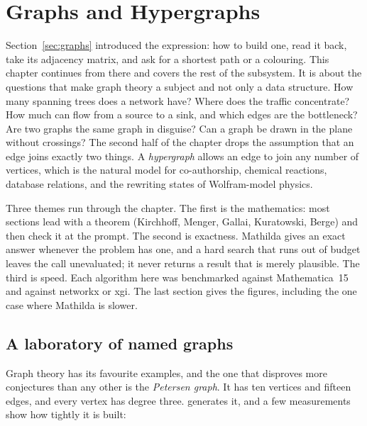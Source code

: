 \chapter{Graphs and Hypergraphs}
\label{ch:graphs}


Section~\ref{sec:graphs} introduced the  expression: how to build one,
read it back, take its adjacency matrix, and ask for a shortest path or a
colouring. This chapter continues from there and covers the rest of the
subsystem. It is about the questions that make graph theory a subject and not
only a data structure. How many spanning trees does a network have? Where does
the traffic concentrate? How much can flow from a source to a sink, and which
edges are the bottleneck? Are two graphs the same graph in disguise? Can a
graph be drawn in the plane without crossings? The second half of the chapter
drops the assumption that an edge joins exactly two things. A \emph{hypergraph}
allows an edge to join any number of vertices, which is the natural model for
co-authorship, chemical reactions, database relations, and the rewriting states
of Wolfram-model physics.

Three themes run through the chapter. The first is the mathematics: most
sections lead with a theorem (Kirchhoff, Menger, Gallai, Kuratowski, Berge) and
then check it at the prompt. The second is exactness. Mathilda gives an exact
answer whenever the problem has one, and a hard search that runs out of budget
leaves the call unevaluated; it never returns a result that is merely plausible.
The third is speed. Each algorithm here was benchmarked against Mathematica~15
and against networkx or xgi. The last section gives the figures, including the
one case where Mathilda is slower.

\section{A laboratory of named graphs}
\label{sec:graphs-families}

Graph theory has its favourite examples, and the one that disproves more
conjectures than any other is the \emph{Petersen graph}.
It has ten vertices and fifteen edges, and every vertex has degree three.
 generates it, and a few measurements show how tightly it is
built:

\begin{codepairs}
\end{codepairs}

